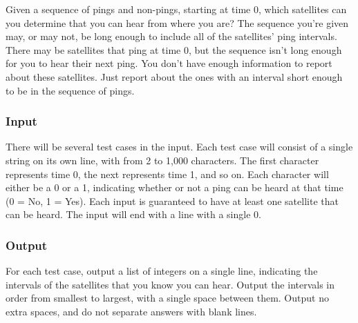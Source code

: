Given a sequence of pings and non-pings, starting at time 0, which satellites can you determine that you can hear from where you are?
The sequence you're given may, or may not, be long enough to include all of the satellites' ping intervals.
There may be satellites that ping at time 0, but the sequence isn't long enough for you to hear their next ping.
You don't have enough information to report about these satellites.
Just report about the ones with an interval short enough to be in the sequence of pings.

\subsubsection{Input}
There will be several test cases in the input.
Each test case will consist of a single string on its own line, with from 2 to 1,000 characters.
The first character represents time 0, the next represents time 1, and so on.
Each character will either be a 0 or a 1, indicating whether or not a ping can be heard at that time (0 = No, 1 = Yes).
Each input is guaranteed to have at least one satellite that can be heard.
The input will end with a line with a single 0.

\subsubsection{Output}
For each test case, output a list of integers on a single line, indicating the intervals of the satellites that you know you can hear.
Output the intervals in order from smallest to largest, with a single space between them.
Output no extra spaces, and do not separate answers with blank lines.
